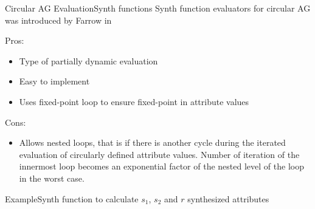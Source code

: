 \begin{frame}{Circular AG Evaluation}{Synth functions}
\alert{Synth function evaluators} for circular AG was introduced by Farrow in \cite{10.1145/13310.13320}

\newlinevspace

{ \footnotesize 

Pros:
\begin{itemize}
    \item Type of \alert{partially dynamic evaluation}
    \item Easy to implement
    \item Uses \alert{fixed-point loop} to ensure fixed-point in attribute values
\end{itemize}

Cons:
\begin{itemize}
    \item Allows \alert{nested loops}, that is if there is another cycle during the iterated evaluation of circularly defined attribute values. Number of iteration of the innermost loop becomes an \alert{exponential factor} of the nested level of the loop in the worst case.
\end{itemize} }

\end{frame}


\begin{frame}{Example}{Synth function to calculate $s_1$, $s_2$ and $r$ synthesized attributes}


\end{frame}


